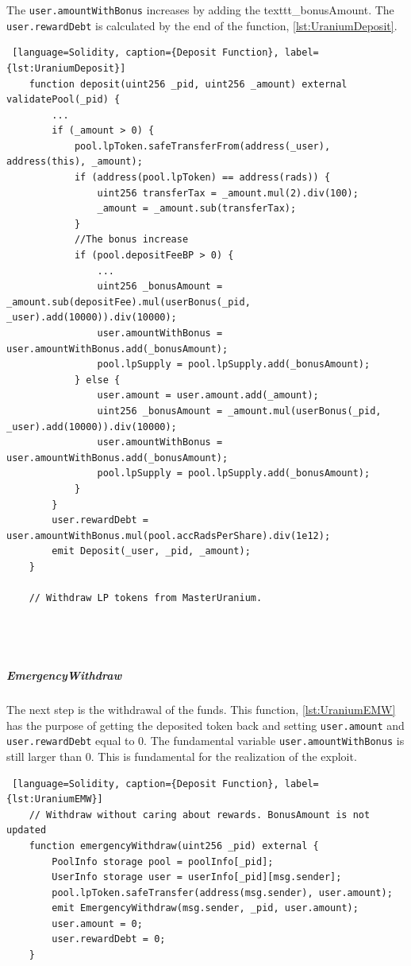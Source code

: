The \texttt{user.amountWithBonus} increases by adding  
the texttt{\_bonusAmount}. 
The \texttt{user.rewardDebt} is calculated by the end of the function, \autoref{lst:UraniumDeposit}.

\begin{lstlisting} [language=Solidity, caption={Deposit Function}, label={lst:UraniumDeposit}]
    function deposit(uint256 _pid, uint256 _amount) external validatePool(_pid) {
        ...
        if (_amount > 0) {
            pool.lpToken.safeTransferFrom(address(_user), address(this), _amount);
            if (address(pool.lpToken) == address(rads)) {
                uint256 transferTax = _amount.mul(2).div(100);
                _amount = _amount.sub(transferTax);
            }
            //The bonus increase
            if (pool.depositFeeBP > 0) {
                ...
                uint256 _bonusAmount = _amount.sub(depositFee).mul(userBonus(_pid, _user).add(10000)).div(10000);
                user.amountWithBonus = user.amountWithBonus.add(_bonusAmount);
                pool.lpSupply = pool.lpSupply.add(_bonusAmount);
            } else {
                user.amount = user.amount.add(_amount);
                uint256 _bonusAmount = _amount.mul(userBonus(_pid, _user).add(10000)).div(10000);
                user.amountWithBonus = user.amountWithBonus.add(_bonusAmount);
                pool.lpSupply = pool.lpSupply.add(_bonusAmount);
            }
        }
        user.rewardDebt = user.amountWithBonus.mul(pool.accRadsPerShare).div(1e12);
        emit Deposit(_user, _pid, _amount);
    }

    // Withdraw LP tokens from MasterUranium.




\end{lstlisting} 

\subparagraph{EmergencyWithdraw} 
The next step is the withdrawal of the funds. 
This function, \autoref{lst:UraniumEMW} has the purpose of getting the deposited token back and setting \texttt{user.amount} and \texttt{user.rewardDebt} equal to 0.
The fundamental variable \texttt{user.amountWithBonus} is still larger than 0. This is fundamental for the realization of the exploit.

\begin{lstlisting} [language=Solidity, caption={Deposit Function}, label={lst:UraniumEMW}]
    // Withdraw without caring about rewards. BonusAmount is not updated
    function emergencyWithdraw(uint256 _pid) external {
        PoolInfo storage pool = poolInfo[_pid];
        UserInfo storage user = userInfo[_pid][msg.sender];
        pool.lpToken.safeTransfer(address(msg.sender), user.amount);
        emit EmergencyWithdraw(msg.sender, _pid, user.amount);
        user.amount = 0;
        user.rewardDebt = 0;
    }
    
\end{lstlisting} 

